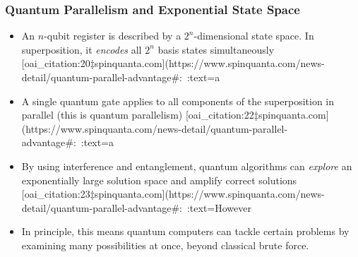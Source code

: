 \documentclass{beamer}
\begin{document}
\begin{frame}
\frametitle{Quantum Parallelism and Exponential State Space}
\begin{itemize}
  \item An $n$-qubit register is described by a $2^n$-dimensional state space.  In superposition, it {\em encodes} all $2^n$ basis states simultaneously [oai_citation:20‡spinquanta.com](https://www.spinquanta.com/news-detail/quantum-parallel-advantage#:~:text=a%
  \item A single quantum gate applies to all components of the superposition in parallel (this is quantum parallelism) [oai_citation:22‡spinquanta.com](https://www.spinquanta.com/news-detail/quantum-parallel-advantage#:~:text=a%
  \item By using interference and entanglement, quantum algorithms can {\em explore} an exponentially large solution space and amplify correct solutions [oai_citation:23‡spinquanta.com](https://www.spinquanta.com/news-detail/quantum-parallel-advantage#:~:text=However%
  \item In principle, this means quantum computers can tackle certain problems by examining many possibilities at once, beyond classical brute force.
\end{itemize}
\end{frame}
\end{document}

